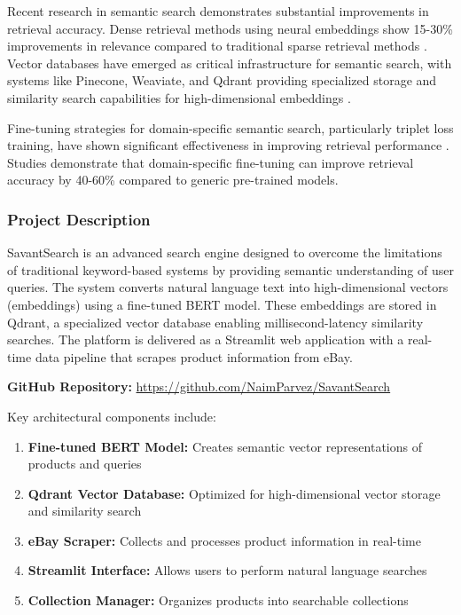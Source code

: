 \documentclass[12pt,a4paper]{article}
\begin{document}
Recent research in semantic search demonstrates substantial improvements in retrieval accuracy. Dense retrieval methods using neural embeddings show 15-30\% improvements in relevance compared to traditional sparse retrieval methods \citep{karpukhin2020dense}. Vector databases have emerged as critical infrastructure for semantic search, with systems like Pinecone, Weaviate, and Qdrant providing specialized storage and similarity search capabilities for high-dimensional embeddings \citep{johnson2019billion}.

Fine-tuning strategies for domain-specific semantic search, particularly triplet loss training, have shown significant effectiveness in improving retrieval performance \citep{reimers2019sentence}. Studies demonstrate that domain-specific fine-tuning can improve retrieval accuracy by 40-60\% compared to generic pre-trained models.

\subsubsection{Project Description}
SavantSearch is an advanced search engine designed to overcome the limitations of traditional keyword-based systems by providing semantic understanding of user queries. The system converts natural language text into high-dimensional vectors (embeddings) using a fine-tuned BERT model. These embeddings are stored in Qdrant, a specialized vector database enabling millisecond-latency similarity searches. The platform is delivered as a Streamlit web application with a real-time data pipeline that scrapes product information from eBay.

\textbf{GitHub Repository:} \url{https://github.com/NaimParvez/SavantSearch}

Key architectural components include:
\begin{enumerate}
    \item \textbf{Fine-tuned BERT Model:} Creates semantic vector representations of products and queries
    \item \textbf{Qdrant Vector Database:} Optimized for high-dimensional vector storage and similarity search
    \item \textbf{eBay Scraper:} Collects and processes product information in real-time
    \item \textbf{Streamlit Interface:} Allows users to perform natural language searches
    \item \textbf{Collection Manager:} Organizes products into searchable collections
\end{enumerate}
\end{document}
